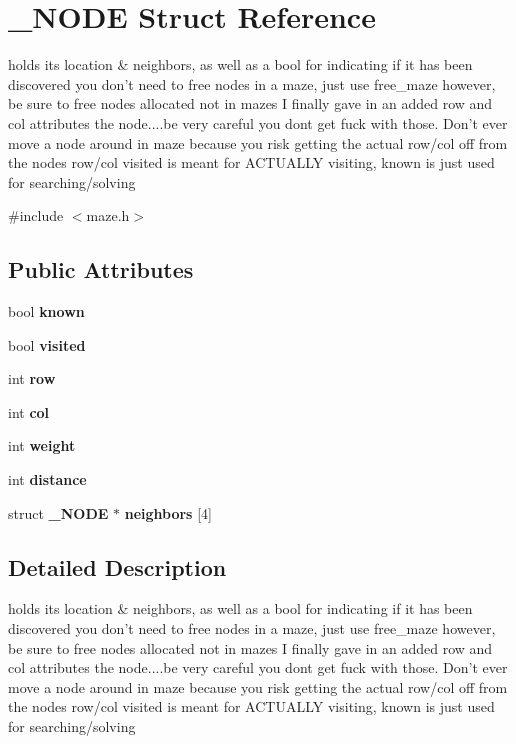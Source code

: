 \section{\-\_\-\-N\-O\-D\-E Struct Reference}
\label{struct__NODE}


holds its location \& neighbors, as well as a bool for indicating if it has been discovered you don't need to free nodes in a maze, just use free\-\_\-maze however, be sure to free nodes allocated not in mazes I finally gave in an added row and col attributes the node....be very careful you dont get fuck with those. Don't ever move a node around in maze because you risk getting the actual row/col off from the nodes row/col visited is meant for A\-C\-T\-U\-A\-L\-L\-Y visiting, known is just used for searching/solving  




{\ttfamily \#include $<$maze.\-h$>$}

\subsection*{Public Attributes}
\begin{DoxyCompactItemize}
\item 
bool {\bf known}
\item 
bool {\bf visited}
\item 
int {\bf row}
\item 
int {\bf col}
\item 
int {\bf weight}
\item 
int {\bf distance}
\item 
struct {\bf \-\_\-\-N\-O\-D\-E} $\ast$ {\bf neighbors} [4]
\end{DoxyCompactItemize}


\subsection{Detailed Description}
holds its location \& neighbors, as well as a bool for indicating if it has been discovered you don't need to free nodes in a maze, just use free\-\_\-maze however, be sure to free nodes allocated not in mazes I finally gave in an added row and col attributes the node....be very careful you dont get fuck with those. Don't ever move a node around in maze because you risk getting the actual row/col off from the nodes row/col visited is meant for A\-C\-T\-U\-A\-L\-L\-Y visiting, known is just used for searching/solving 

